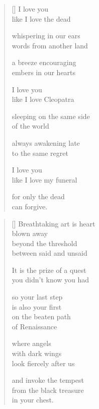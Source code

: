 \documentclass[14pt]{extbook}
\newcommand*{\centeredornament}{\centerline{\pgfornament[width=6cm]{88}}}
\begin{document}

\newpage

\vspace*{-15mm}
\centeredornament
\vspace*{-7mm}


\settowidth{\versewidth}{sleeping on the same side}

\begin{verse}[\versewidth]
  I love you \\
  like I love the dead

  whispering in our ears \\
  words from another land

  a breeze encouraging \\
  embers in our hearts

  I love you \\
  like I love Cleopatra

  sleeping on the same side \\
  of the world

  always awakening late \\
  to the same regret

  I love you \\
  like I love my funeral

  for only the dead \\
  can forgive.
\end{verse}


\newpage

\vspace*{-15mm}
\centeredornament
\vspace*{-7mm}


\settowidth{\versewidth}{you didn't know you had}

\begin{verse}[\versewidth]
  Breathtaking art is heart \\
  blown away \\
  beyond the threshold \\
  between said and unsaid

  It is the prize of a quest \\
  you didn't know you had

  so your last step \\
  is also your first \\
  on the beaten path \\
  of Renaissance

  where angels \\
  with dark wings \\
  look fiercely after us

  and invoke the tempest \\
  from the black treasure \\
  in your chest.
\end{verse}
\end{document}

